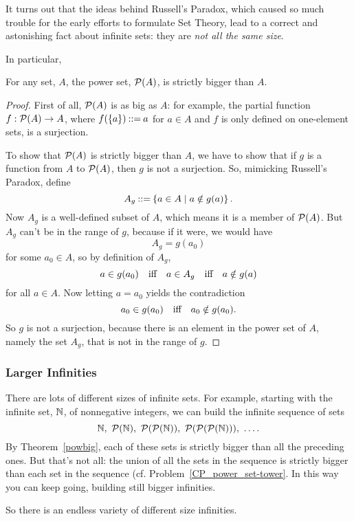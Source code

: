 It turns out that the ideas behind Russell's Paradox, which caused so much
trouble for the early efforts to formulate Set Theory, lead to a correct
and astonishing fact about infinite sets: they are \emph{not all the same
  size}.

In particular,
\begin{theorem}\label{powbig}
For any set, $A$, the power set, $\mathcal{P}(A)$, is strictly bigger than $A$.
\end{theorem}
\begin{proof}
  First of all, $\mathcal{P}(A)$ is as big as $A$: for example, the partial
  function $f:\mathcal{P}(A) \to A$, where $f(\left\{a\right\}) \mathbin{::=} a$ for $a \in A$
  and $f$ is only defined on one-element sets, is a surjection.

  To show that $\mathcal{P}(A)$ is strictly bigger than $A$, we have to show
  that if $g$ is a function from $A$ to $\mathcal{P}(A)$, then $g$ is not a
  surjection.  So, mimicking Russell's Paradox, define
  \[
  A_g \mathbin{::=} \left\{a \in A \mid a \notin g(a)\right\}.
  \]
  Now $A_g$ is a well-defined subset of $A$, which means it is a member of
  $\mathcal{P}(A)$.  But $A_g$ can't be in the range of $g$, because if it
  were, we would have
\[
A_g = g(a_0)
\]
for some $a_0 \in A$, so by definition of $A_g$,
\[
a \in g(a_0) \quad \text{iff} \quad a \in A_g \quad \text{iff} \quad a \notin g(a)
\]
for all $a \in A$.  Now letting $a = a_0$ yields the contradiction
\[
a_0 \in g(a_0) \quad \text{iff} \quad a_0 \notin g(a_0).
\]
So $g$ is not a surjection, because there is an element in the power set
of $A$, namely the set $A_g$, that is not in the range of $g$.
\end{proof}

\subsubsection{Larger Infinities}

There are lots of different sizes of infinite sets.  For example, starting
with the infinite set, $\mathbb{N}$, of nonnegative integers, we can build
the infinite sequence of sets
\[
\naturals,\ \power(\naturals),\ \power(\power(\naturals)),\
\power(\power(\power(\naturals))),\ \dots.
\]
By Theorem~\ref{powbig}, each of these sets is strictly bigger than all
the preceding ones.  But that's not all: the union of all the sets in the
sequence is strictly bigger than each set in the sequence
(cf. Problem~\ref{CP_power_set-tower}.  In this way you can keep going,
building still bigger infinities.

So there is an endless variety of different size infinities.

